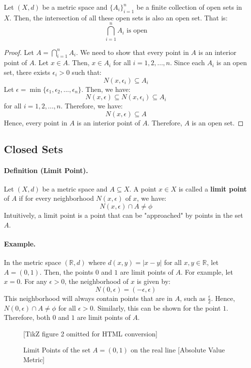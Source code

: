 \documentclass[openany]{book}
\numberwithin{equation}{section}
\begin{document}
    Let $(X, d)$ be a metric space and $\{A_i\}_{i=1}^{n}$ be a finite collection of open sets in $X$. Then, the intersection of all these open sets is also an open set. That is:
    $$\bigcap_{i=1}^{n} A_i \text{ is open}$$
\par
\begin{proof}
    Let $A = \bigcap_{i=1}^{n} A_i$. We need to show that every point in $A$ is an interior point of $A$. Let $x \in A$. Then, $x \in A_i$ for all $i = 1, 2, ..., n$. Since each $A_i$ is an open set, there exists $\epsilon_i > 0$ such that:
    $$N(x, \epsilon_i) \subseteq A_i$$
    Let $\epsilon = \min\{\epsilon_1, \epsilon_2, ..., \epsilon_n\}$. Then, we have:
    $$N(x, \epsilon) \subseteq N(x, \epsilon_i) \subseteq A_i$$
    for all $i = 1, 2, ..., n$. Therefore, we have:
    $$N(x, \epsilon) \subseteq A$$
    Hence, every point in $A$ is an interior point of $A$. Therefore, $A$ is an open set.
\end{proof}
\subsection{Closed Sets}
\paragraph{Definition (Limit Point).}

    Let $(X, d)$ be a metric space and $A \subseteq X$. A point $x \in X$ is called a \textbf{limit point} of $A$ if for every neighborhood $N(x, \epsilon)$ of $x$, we have:
    $$N(x, \epsilon) \cap A \neq \phi$$
    Intuitively, a limit point is a point that can be "approached" by points in the set $A$.
\par
\paragraph{Example.}

    In the metric space $(\mathbb{R}, d)$ where $d(x, y) = |x - y|$ for all $x, y \in \mathbb{R}$, let $A = (0, 1)$. Then, the points $0$ and $1$ are limit points of $A$. For example, let $x = 0$. For any $\epsilon > 0$, the neighborhood of $x$ is given by:
    $$N(0, \epsilon) = (-\epsilon, \epsilon)$$
    This neighborhood will always contain points that are in $A$, such as $\frac{\epsilon}{2}$. Hence, $N(0, \epsilon) \cap A \neq \phi$ for all $\epsilon > 0$. Similarly, this can be shown for the point $1$. Therefore, both $0$ and $1$ are limit points of $A$.
\par
\begin{figure}[H]
    \centering
    

[TikZ figure 2 omitted for HTML conversion]

    \caption{Limit Points of the set $A = (0, 1)$ on the real line [Absolute Value Metric]}
\end{figure}
\end{document}
